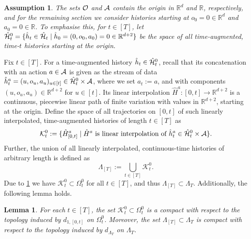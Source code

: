 \documentclass[
    a4paper,
    11pt,
    bibliography=totoc,
    listof=totoc,      
    headinclude=true,
    cleardoublepage=empty,
]{scrbook}
\theoremstyle{plain}
\newtheorem{lemma}[theorem]{Lemma}
\newtheorem{assumption}{Assumption}
\theoremstyle{definition}
\theoremstyle{remark}
\newcommand{\SetR}{\mathbb R}
\newcommand{\SpaceA}{{\cal A}}
\newcommand{\SpaceO}{{\cal O}}
\newcommand{\SpaceH}{{\cal H}}
\begin{document}
\begin{assumption}
\label{ass:SpacesContainOrigin}
    The sets $\SpaceO$ and $\SpaceA$ contain the origin in $\SetR^d$ and 
    $\SetR$, respectively, and for the remaining section we consider histories 
    starting at $o_0=0\in\SetR^d$ and $a_0=0\in\SetR$. To emphasise this, for 
    $t\in[T]$, let $\hat\SpaceH^0_t = \{ \hat h_t\in\hat\SpaceH_t \mid 
    \hat h_0 = (0,o_0,a_0) = 0 \in\SetR^{d+2}\}$ be the space of all time-augmented, 
    time-$t$ histories starting at the origin.
\end{assumption}
Fix $t\in[T]$. For a time-augmented history $\hat{h}_t \in\hat{\SpaceH}^0_t$, 
recall that its concatenation with an action $a\in\SpaceA$ is given as the 
stream of data $\hat{h}_t^{a} = (u, o_u, a_u)_{u\in[t]} \in \hat\SpaceH^0_t 
\times\SpaceA$, where we set $a_t := a$, and with components $(u,o_u,a_u) \in 
\SetR^{d+2}$ for $u\in[t]$. Its linear interpolation $\hat H^{a}:[0,t] \to 
\SetR^{d+2}$ is a continuous, piecewise linear path of finite variation with 
values in $\SetR^{d+2}$, starting at the origin. Define the 
space of all trajectories on $[0,t]$ of such linearly interpolated, 
time-augmented histories of length $t\in[T]$ as
\begin{equation}
    \mathcal{K}^0_t 
    := \{\hat H^{a}_{[0,t]} 
    \mid \hat H^{a} \text{ is linear interpolation of } 
    \hat h^{a}_t\in\hat\SpaceH^0_t\times\SpaceA\}.
\end{equation}
Further, the union of all linearly interpolated, continuous-time
histories of arbitrary length is defined as
\begin{equation}
\label{eq:UnionLinearInterpolations}
    \Lambda_{[T]} := \bigcup_{t\in[T]} \mathcal{K}^0_t.
\end{equation}
Due to \cref{ass:SpacesContainOrigin} we have 
$\mathcal{K}^0_t\subset\Omega_t^0$ for all $t\in[T]$, and thus 
$\Lambda_{[T]}\subset\Lambda_T$. Additionally, the following lemma holds.
\begin{lemma}
    For each $t\in[T]$, the set $\mathcal{K}^0_t\subset\Omega_t^0$ is a compact with respect to the topology induced by $d_{1,[0,t]}$ on $\Omega_t^0$. Moreover, the set $\Lambda_{[T]}\subset\Lambda_T$ is compact with respect to the topology induced by $d_{\Lambda_T}$ on $\Lambda_T$.
\end{lemma}
\end{document}
